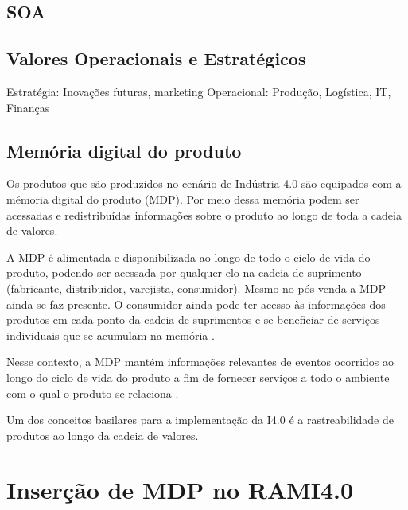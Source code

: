 \documentclass[
	12pt,				%
	oneside,			%
	a4paper,			%
	english,			%
	brazil				%
]{abntex2}
\begin{document}
	
		
	\section{SOA}

		\lipsum[1-1]
		
	\section{Valores Operacionais e Estratégicos}

	Estratégia: Inovações futuras, marketing
	Operacional:  Produção, Logística, IT, Finanças


	\section{Memória digital do produto}
	
	Os produtos que são produzidos no cenário de Indústria 4.0 são equipados com a mémoria digital do produto (MDP). Por meio dessa memória podem ser acessadas e redistribuídas informações sobre o produto ao longo de toda a cadeia de valores.

	A MDP é alimentada e disponibilizada ao longo de todo o ciclo de vida do produto, podendo ser acessada por qualquer elo na cadeia de suprimento (fabricante, distribuidor, varejista, consumidor). Mesmo no pós-venda a MDP ainda se faz presente. O consumidor ainda pode ter acesso às informações dos produtos em cada ponto da cadeia de suprimentos e se beneficiar de serviços individuais que se acumulam na memória \cite{brandherm2011productmemory}.

	Nesse contexto, a MDP mantém informações relevantes de eventos ocorridos ao longo do ciclo de vida do produto a fim de fornecer serviços a todo o ambiente com o qual o produto se relaciona \cite{brandherm2011productmemory}.

	Um dos conceitos basilares para a implementação da I4.0 é a rastreabilidade de produtos ao longo da cadeia de valores.







\chapter{Inserção de MDP no RAMI4.0}
\end{document}

